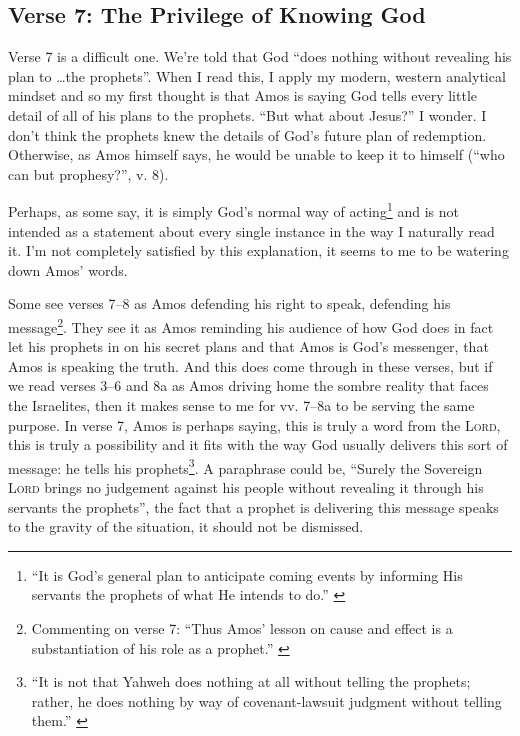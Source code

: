 \subsection{Verse 7: The Privilege of Knowing God}

Verse 7 is a difficult one. We're told that God \enquote{does nothing without
revealing his plan to \dots the prophets}. When I read this, I apply my modern,
western analytical mindset and so my first thought is that Amos is saying God
tells every little detail of all of his plans to the prophets. \enquote{But what
about Jesus?} I wonder. I don't think the prophets knew the details of God's
future plan of redemption. Otherwise, as Amos himself says, he would be unable
to keep it to himself (\enquote{who can but prophesy?}, v. 8).

Perhaps, as some say, it is simply God's normal way of acting\footnote{%
    \enquote{It is God's general plan to anticipate coming events by informing
    His servants the prophets of what He intends to do.}
    \autocite[73]{motyer:1974}
} and is not intended as a statement about every single instance in the way I
naturally read it. I'm not completely satisfied by this explanation, it seems to
me to be watering down Amos' words.

Some see verses 7--8 as Amos defending his right to speak, defending his
message\footnote{%
    Commenting on verse 7: \enquote{Thus Amos' lesson on cause and effect is a
    substantiation of his role as a prophet.} \autocite[381]{mccomiskey:2009}
}. They see it as Amos reminding his audience of how God does in fact let his
prophets in on his secret plans and that Amos is God's messenger, that Amos is
speaking the truth. And this does come through in these verses, but if we read
verses 3--6 and 8a as Amos driving home the sombre reality that faces the
Israelites, then it makes sense to me for vv. 7--8a to be serving the same
purpose. In verse 7, Amos is perhaps saying, this is truly a word from the
\textsc{Lord}, this is truly a possibility and it fits with the way God usually
delivers this sort of message: he tells his prophets\footnote{%
    \enquote{It is not that Yahweh does nothing at all without telling the
    prophets; rather, he does nothing by way of covenant-lawsuit judgment
    without telling them.} \autocite[380]{mccomiskey:2009}
}. A paraphrase could be, \enquote{Surely the Sovereign \textsc{Lord} brings no
judgement against his people without revealing it through his servants the
prophets}, the fact that a prophet is delivering this message speaks to the
gravity of the situation, it should not be dismissed.

